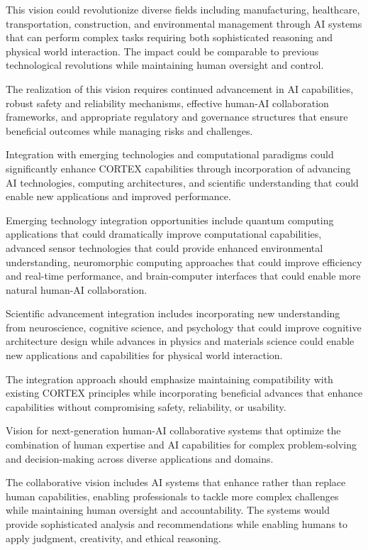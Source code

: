 This vision could revolutionize diverse fields including manufacturing, healthcare, transportation, construction, and environmental management through AI systems that can perform complex tasks requiring both sophisticated reasoning and physical world interaction. The impact could be comparable to previous technological revolutions while maintaining human oversight and control.

The realization of this vision requires continued advancement in AI capabilities, robust safety and reliability mechanisms, effective human-AI collaboration frameworks, and appropriate regulatory and governance structures that ensure beneficial outcomes while managing risks and challenges.

Integration with emerging technologies and computational paradigms could significantly enhance CORTEX capabilities through incorporation of advancing AI technologies, computing architectures, and scientific understanding that could enable new applications and improved performance.

Emerging technology integration opportunities include quantum computing applications that could dramatically improve computational capabilities, advanced sensor technologies that could provide enhanced environmental understanding, neuromorphic computing approaches that could improve efficiency and real-time performance, and brain-computer interfaces that could enable more natural human-AI collaboration.

Scientific advancement integration includes incorporating new understanding from neuroscience, cognitive science, and psychology that could improve cognitive architecture design while advances in physics and materials science could enable new applications and capabilities for physical world interaction.

The integration approach should emphasize maintaining compatibility with existing CORTEX principles while incorporating beneficial advances that enhance capabilities without compromising safety, reliability, or usability.

Vision for next-generation human-AI collaborative systems that optimize the combination of human expertise and AI capabilities for complex problem-solving and decision-making across diverse applications and domains.

The collaborative vision includes AI systems that enhance rather than replace human capabilities, enabling professionals to tackle more complex challenges while maintaining human oversight and accountability. The systems would provide sophisticated analysis and recommendations while enabling humans to apply judgment, creativity, and ethical reasoning.

